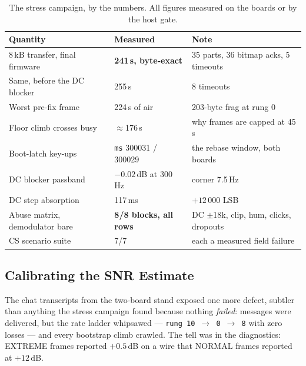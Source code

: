 \begin{table}[H]
    \centering
    \caption{The stress campaign, by the numbers. All figures measured
             on the boards or by the host gate.}
    \label{tab:harden}
    \small
    \begin{tabular}{@{}lll@{}}
    \toprule
    \textbf{Quantity} & \textbf{Measured} & \textbf{Note} \\
    \midrule
    8\,kB transfer, final firmware & \textbf{241\,s, byte-exact} & 35
        parts, 36 bitmap acks, 5 timeouts \\
    Same, before the DC blocker & 255\,s & 8 timeouts \\
    Worst pre-fix frame & 224\,s of air & 203-byte frag at rung 0 \\
    Floor climb crosses busy & $\approx$176\,s & why frames are capped
        at 45\,s \\
    Boot-latch key-ups & \texttt{ms} 300031 / 300029 & the rebase
        window, both boards \\
    DC blocker passband & $-0.02$\,dB at 300\,Hz & corner 7.5\,Hz \\
    DC step absorption & 117\,ms & $+12\,000$ LSB \\
    Abuse matrix, demodulator bare & \textbf{8/8 blocks, all rows} &
        DC $\pm$18k, clip, hum, clicks, dropouts \\
    CS scenario suite & 7/7 & each a measured field failure \\
    \bottomrule
    \end{tabular}
\end{table}

\subsection{Calibrating the SNR Estimate}
\label{sec:cport_snrcal}

The chat transcripts from the two-board stand exposed one more defect,
subtler than anything the stress campaign found because nothing
\emph{failed}: messages were delivered, but the rate ladder whipsawed
--- \texttt{rung 10 $\to$ 0 $\to$ 8} with zero losses --- and every
bootstrap climb crawled. The tell was in the diagnostics: EXTREME
frames reported $+0.5$\,dB on a wire that NORMAL frames reported at
$+12$\,dB.

